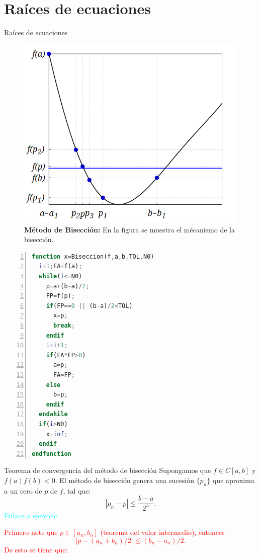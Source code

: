 \section{Raíces de ecuaciones}
\begin{frame}{Raíces de ecuaciones}
\begin{figure}[H]
\begin{center}
\includegraphics[scale=0.7]{Imagen20}
\end{center}
\caption{\textbf{Método de Bisección: }En la figura se muestra el mécanismo de la bisección.}
\end{figure}
\begin{lstlisting}[caption=''Método de Bisección'',style=mystyle,language=octave,numbers=left]
function x=Biseccion(f,a,b,TOL,N0)
  i=1;FA=f(a);
  while(i<=N0)
    p=a+(b-a)/2;
    FP=f(p);
    if(FP==0 || (b-a)/2<TOL)
      x=p;
      break;
    endif
    i=i+1;
    if(FA*FP>0) 
      a=p;
      FA=FP;
    else
      b=p;  
    endif
  endwhile
  if(i>N0)
    x=inf;
  endif
endfunction
\end{lstlisting}
\begin{block}{Teorema de convergencia del método de bisección}
Supongamos que $f\in C[a,b]$ y $f(a)f(b)<0$. El método de bisección genera una sucesión $\{p_n\}$ que aproxima a un cero de $p$ de $f$, tal que:
$$|p_n-p|\leq \dfrac{b-a}{2^n}.$$
\hyperlink{EjercicioBiseccion}{\textcolor{cyan}{Enlace a ejercicio}}
\end{block}
\textcolor{red}{
\indent Primero note que $p\in [a_n,b_n]$ (teorema del valor intermedio), entonces $$|p-(a_n+b_n)/2|\leq(b_n-a_n)/2.$$ De esto se tiene que:
}
\end{frame}

